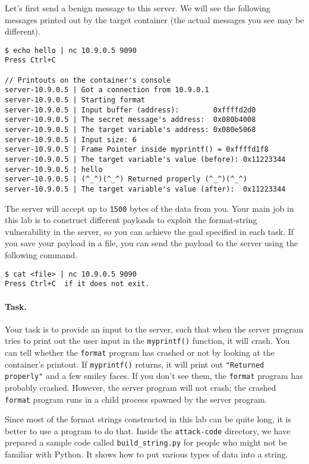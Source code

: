Let's first send a benign message to this server.
We will see the following messages printed out by the target container (the
actual messages you see may be different).

\begin{lstlisting}
$ echo hello | nc 10.9.0.5 9090
Press Ctrl+C

// Printouts on the container's console
server-10.9.0.5 | Got a connection from 10.9.0.1
server-10.9.0.5 | Starting format
server-10.9.0.5 | Input buffer (address):        0xffffd2d0
server-10.9.0.5 | The secret message's address:  0x080b4008
server-10.9.0.5 | The target variable's address: 0x080e5068
server-10.9.0.5 | Input size: 6
server-10.9.0.5 | Frame Pointer inside myprintf() = 0xffffd1f8
server-10.9.0.5 | The target variable's value (before): 0x11223344
server-10.9.0.5 | hello
server-10.9.0.5 | (^_^)(^_^) Returned properly (^_^)(^_^)
server-10.9.0.5 | The target variable's value (after):  0x11223344
\end{lstlisting}
 
The server will accept up to \texttt{1500} bytes of the data from you.
Your main job in this lab is to construct different payloads to exploit the format-string 
vulnerability in the server, so you can achieve the goal specified in 
each task. If you save your payload in a file, you can send the payload
to the server using the following command.

\begin{lstlisting}
$ cat <file> | nc 10.9.0.5 9090
Press Ctrl+C  if it does not exit.
\end{lstlisting}

\paragraph{Task.} Your task is to provide an input to the server, such that
when the server program tries to print out the user input in the 
\texttt{myprintf()} function, it will crash. You can tell whether
the \texttt{format} program has crashed or not by looking at the 
container's printout.  If \texttt{myprintf()} returns, 
it will print out \texttt{"Returned properly"} and a few smiley faces.
If you don't see them, the \texttt{format} program has probably crashed.
However, the server program will not crash; the crashed \texttt{format} program
runs in a child process spawned by the server program. 


Since most of the format strings constructed in this lab can be quite long,
it is better to use a program to do that. Inside the \texttt{attack-code} 
directory, we have prepared a sample code called \texttt{build\_string.py}
for people who might not be familiar with Python. It shows how to put 
various types of data into a string. 




